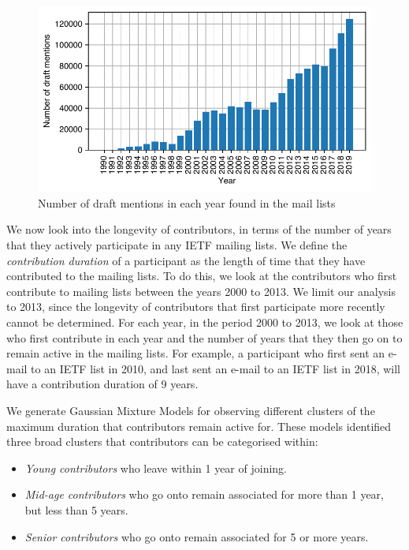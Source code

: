 \documentclass[twocolumn,10pt]{article}
\newlength{\figureWidthOneColumn}
\newcommand{\pb}[1]{\vspace{0.75ex}\noindent{\textbf{#1}}}
\begin{document}
\begin{figure}
  \centering
  \includegraphics[width=\figureWidthOneColumn]{figures-prev/imc-2021/emails/yearly-draft-mention-volume.pdf}
  \caption{
    Number of draft mentions in each year found in the mail lists
  }
  \label{fig:draft_mentions}
\end{figure}

\pb{Contribution duration.}
We now look into the longevity of contributors, in terms of the number of
years that they actively participate in any IETF mailing lists. We define
the \textit{contribution duration} of a participant as the length of time
that they have contributed to the mailing lists.  To do this, we look at
the contributors who first contribute to mailing lists between the years
2000 to 2013. We limit our analysis to 2013, since the longevity of
contributors that first participate more recently cannot be determined.
For each year, in the period 2000 to 2013, we look at those who first
contribute in each year and the number of years that they then go on to
remain active in the mailing lists. For example, a participant who first
sent an e-mail to an IETF list in 2010, and last sent an e-mail to an IETF
list in 2018, will have a contribution duration of 9 years.

We generate Gaussian Mixture Models for observing different clusters of the
maximum duration that contributors remain active for.  These models
identified three broad clusters that contributors can be categorised
within:

\begin{itemize}
  \item \emph{Young contributors} who leave within 1 year of joining.
  \item \emph{Mid-age contributors} who go onto remain associated for
    more than 1 year, but less than 5 years.
  \item \emph{Senior contributors} who go onto remain associated for 5 or
    more years.
\end{itemize}
\end{document}
